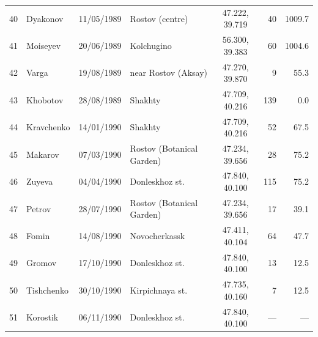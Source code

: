 \documentclass[11pt,a4paper]{article}
\begin{document}
{\begin{longtable}{rllp{3.6cm}crr}
40 & Dyakonov & 11/05/1989 & Rostov (centre) & 47.222, 39.719 & 40 & 1009.7\\
41 & Moiseyev & 20/06/1989 & Kolchugino & 56.300, 39.383 & 60 & 1004.6\\
42 & Varga & 19/08/1989 & near Rostov (Aksay) & 47.270, 39.870 & 9 & 55.3\\
43 & Khobotov & 28/08/1989 & Shakhty & 47.709, 40.216 & 139 & 0.0\\
44 & Kravchenko & 14/01/1990 & Shakhty & 47.709, 40.216 & 52 & 67.5\\
45 & Makarov & 07/03/1990 & Rostov (Botanical Garden) & 47.234, 39.656 & 28 & 75.2\\
46 & Zuyeva & 04/04/1990 & Donleskhoz st. & 47.840, 40.100 & 115 & 75.2\\
47 & Petrov & 28/07/1990 & Rostov (Botanical Garden) & 47.234, 39.656 & 17 & 39.1\\
48 & Fomin & 14/08/1990 & Novocherkassk & 47.411, 40.104 & 64 & 47.7\\
49 & Gromov & 17/10/1990 & Donleskhoz st. & 47.840, 40.100 & 13 & 12.5\\
50 & Tishchenko & 30/10/1990 & Kirpichnaya st. & 47.735, 40.160 & 7 & 12.5\\
51 & Korostik & 06/11/1990 & Donleskhoz st. & 47.840, 40.100 & --- & ---\\
\bottomrule
\end{longtable}}
\end{document}
